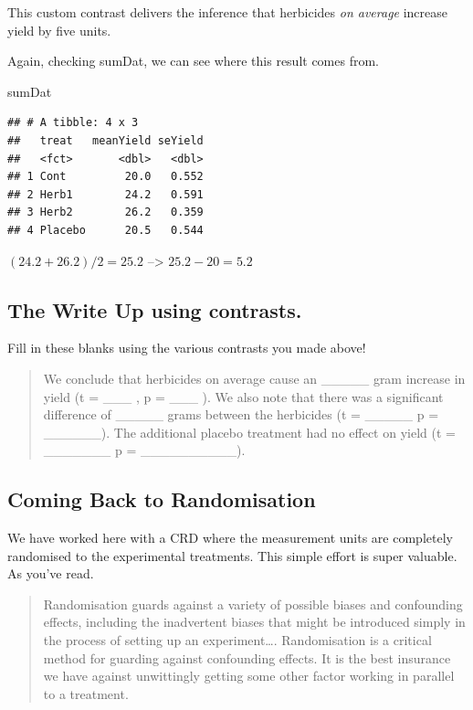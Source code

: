 \documentclass[
]{book}
\newenvironment{Shaded}{\begin{snugshade}}{\end{snugshade}}
\newcommand{\NormalTok}[1]{#1}
\begin{document}
This custom contrast delivers the inference that herbicides \emph{on average} increase yield by five units.

Again, checking sumDat, we can see where this result comes from.

\begin{Shaded}
\begin{Highlighting}[]
\NormalTok{sumDat}
\end{Highlighting}
\end{Shaded}

\begin{verbatim}
## # A tibble: 4 x 3
##   treat   meanYield seYield
##   <fct>       <dbl>   <dbl>
## 1 Cont         20.0   0.552
## 2 Herb1        24.2   0.591
## 3 Herb2        26.2   0.359
## 4 Placebo      20.5   0.544
\end{verbatim}

\((24.2+26.2)/2 = 25.2\) --\textgreater{} \(25.2 - 20 = 5.2\)

\hypertarget{the-write-up-using-contrasts.}{%
\subsection{The Write Up using contrasts.}\label{the-write-up-using-contrasts.}}

Fill in these blanks using the various contrasts you made above!

\begin{quote}
We conclude that herbicides on average cause an \_\_\_\_\_ gram increase in yield (t = \_\_\_ , p = \_\_\_ ). We also note that there was a significant difference of \_\_\_\_\_ grams between the herbicides (t = \_\_\_\_\_ p = \_\_\_\_\_\_). The additional placebo treatment had no effect on yield (t = \_\_\_\_\_\_\_ p = \_\_\_\_\_\_\_\_\_\_).
\end{quote}

\hypertarget{coming-back-to-randomisation}{%
\subsection{Coming Back to Randomisation}\label{coming-back-to-randomisation}}

We have worked here with a CRD where the measurement units are completely randomised to the experimental treatments. This simple effort is super valuable. As you've read.

\begin{quote}
Randomisation guards against a variety of possible biases and confounding effects, including the inadvertent biases that might be introduced simply in the process of setting up an experiment\ldots. Randomisation is a critical method for guarding against confounding effects. It is the best insurance we have against unwittingly getting some other factor working in parallel to a treatment.
\end{quote}
\end{document}
